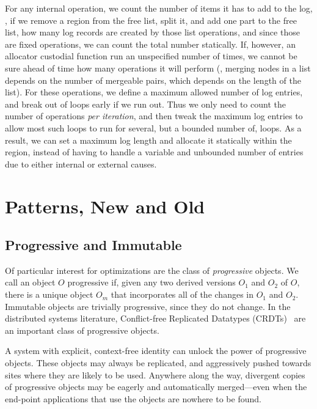 For any internal operation, we count the number of items it has to add to the log, \eg, if we remove a region from the
free list, split it, and add one part to the free list, how many log records are created by those list operations, and
since those are fixed operations, we can count the total number statically. If, however, an allocator custodial function
run an unspecified number of times, we cannot be sure ahead of time how many operations it will perform (\eg, merging
nodes in a list depends on the number of mergeable pairs, which depends on the length of the list). For these
operations, we define a maximum allowed number of log entries, and break out of loops early if we run out. Thus we only
need to count the number of operations \emph{per iteration}, and then tweak the maximum log entries to allow most such
loops to run for several, but a bounded number of, loops. As a result, we can set a maximum log length and allocate it
statically within the region, instead of having to handle a variable and unbounded number of entries due to either
internal or external causes.

\section{Patterns, New and Old}


\subsection{Progressive and Immutable}

Of particular interest for optimizations are the class of \emph{progressive} objects.
We call an object $O$ progressive if,
given any two derived versions $O_1$ and $O_2$ of $O$, there is a unique object $O_m$ that incorporates all of the changes in $O_1$ and $O_2$.
Immutable objects are trivially progressive, since they do not change.
In the distributed systems literature, Conflict-free Replicated Datatypes
(CRDTs)~\cite{shapiro2011comprehensive}
are an important class of progressive objects.

A system with explicit, context-free identity can unlock the power of progressive objects.
These objects may always be replicated, and aggressively pushed towards
sites where they are likely to be used.
Anywhere along the way, divergent copies of progressive objects may be eagerly and automatically
merged---even when the end-point applications that use the objects are nowhere to be found.

